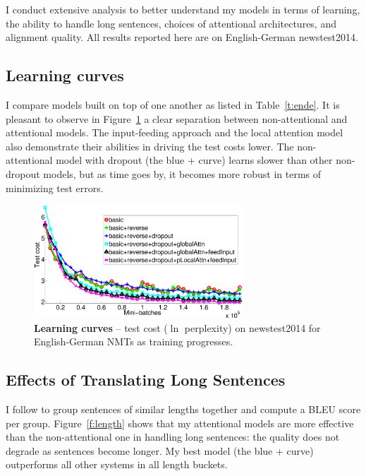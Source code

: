 I conduct extensive analysis to better understand my models in terms
of learning, the ability to handle long sentences, 
choices of attentional architectures, and alignment quality. All results
reported here are on English-German newstest2014.

\subsection{Learning curves}
I compare models built on top of one another %
as listed in Table~\ref{t:ende}. It is
pleasant to observe in Figure~\ref{f:learn} a clear separation between non-attentional and attentional
models. The input-feeding approach and the local attention
model also demonstrate their abilities in driving the test costs lower. The
non-attentional model with 
dropout (the blue + curve) learns slower than other non-dropout models, but
as time goes by, it becomes more robust in terms of minimizing test errors.
\begin{figure}
\centering
\includegraphics[width=0.7\textwidth, clip=true, trim=140 0 70 0]{img/4-learning} %
\caption[Learning curves]{{\bf Learning curves} -- test cost ($\ln$ perplexity) on newstest2014 for English-German NMTs as training progresses.
} 
\label{f:learn}
\end{figure}

\subsection{Effects of Translating Long Sentences}
I follow \cite{bog15} to group sentences of similar lengths together and
compute a BLEU score per group. Figure~\ref{f:length} shows that
my attentional models are more effective than the non-attentional one in
handling long sentences: the quality does not degrade as sentences
become longer. My best model (the blue + curve) outperforms all other systems in all length buckets.

